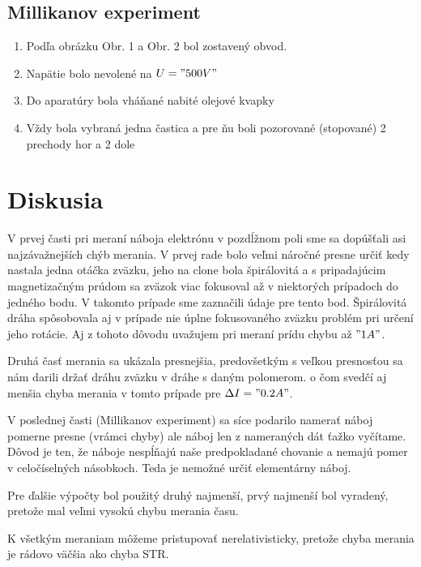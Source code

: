 \documentclass[10pt]{scrartcl}
\begin{document}
\subsection{Millikanov experiment}
\begin{enumerate}
\item Podľa obrázku Obr. 1 a Obr. 2 \cite{C_4} bol zostavený obvod.
\item Napätie bolo nevolené na $U = "500 V"$
\item Do aparatúry bola vháňané nabité olejové kvapky
\item Vždy bola vybraná jedna častica a pre ňu boli pozorované (stopované) 2 prechody hor a 2 dole
\end{enumerate}




\section{Diskusia}

V prvej časti pri meraní náboja elektrónu v pozdĺžnom poli sme sa dopúšťali asi najzávažnejších chýb merania.
V prvej rade bolo veľmi náročné presne určiť kedy nastala jedna otáčka zväzku, jeho  na clone bola špirálovitá a s pripadajúcim magnetizačným prúdom sa zväzok viac fokusoval až v niektorých prípadoch do jedného bodu. V takomto prípade sme zaznačili údaje pre tento bod. Špirálovitá dráha spôsobovala aj v prípade nie úplne fokusovaného zväzku problém pri určení jeho rotácie. Aj z tohoto dôvodu uvažujem pri meraní prídu chybu až $"1 A"$.

Druhá časť merania sa ukázala presnejšia, predovšetkým s veľkou presnosťou sa nám darili držať dráhu zväzku v dráhe s daným polomerom.
o čom svedčí aj menšia chyba merania v tomto prípade pre $\Delta I = "0.2 A"$.

V poslednej časti (Millikanov experiment) sa síce podarilo namerať náboj pomerne presne (vrámci chyby) ale náboj len z nameraných dát ťažko vyčítame. Dôvod je ten, že náboje nespĺňajú naše predpokladané chovanie a nemajú pomer v celočíselných násobkoch. Teda je nemožné určiť elementárny náboj.

Pre ďalšie výpočty bol použitý druhý najmenší, prvý najmenší bol vyradený, pretože mal veľmi vysokú chybu merania času.

K všetkým meraniam môžeme pristupovať nerelativisticky, pretože chyba merania je rádovo väčšia ako chyba STR.
\end{document}
